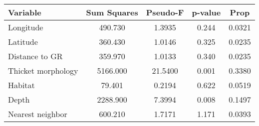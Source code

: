 \captionsetup[table]{labelformat=empty,skip=1pt}
\begin{longtable}{lcccc}
\toprule
\textbf{Variable} & \textbf{Sum Squares} & \textbf{Pseudo-F} & \textbf{p-value} & \textbf{Prop} \\ 
\midrule
Longitude & 490.730 & 1.3935 & 0.244 & 0.0321 \\ 
Latitude & 360.430 & 1.0146 & 0.325 & 0.0235 \\ 
Distance to GR & 359.970 & 1.0133 & 0.340 & 0.0235 \\ 
Thicket morphology & 5166.000 & 21.5400 & 0.001 & 0.3380 \\ 
Habitat & 79.401 & 0.2194 & 0.622 & 0.0519 \\ 
Depth & 2288.900 & 7.3994 & 0.008 & 0.1497 \\ 
Nearest neighbor & 600.210 & 1.7171 & 1.171 & 0.0393 \\ 
\bottomrule
\end{longtable}

